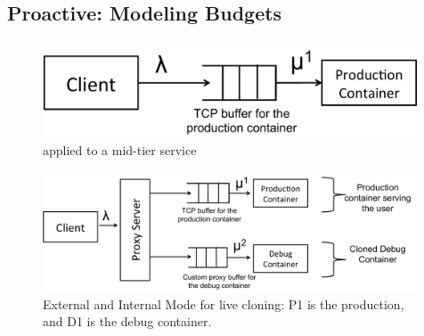\subsection{Proactive: Modeling Budgets}
\label{sec:queue_model}


\begin{figure}[t!]

		\centering
		\includegraphics[width=0.99\textwidth]{queue/figs/queue.pdf}
		\caption{\parikshan applied to a mid-tier service}
		\label{fig:queueModel}
\end{figure}
\begin{figure}
		\centering
		\includegraphics[width=0.99\textwidth]{queue/figs/queueCloned.pdf}
		\caption{External and Internal Mode for live cloning: P1 is the production, and D1 is the debug container.}
		\label{fig:queueClonedModel}
\end{figure}
	

